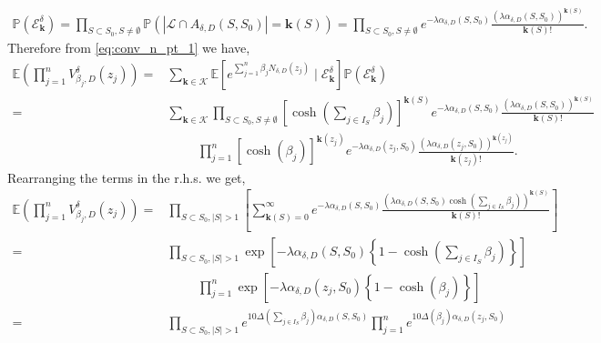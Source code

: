 \documentclass[a4paper, 11pt, reqno]{amsart}
\theoremstyle{definition} \newtheorem{defn}{Definition}[section]
\theoremstyle{remark} \newtheorem{rem}[defn]{Remark}
\theoremstyle{remark} \newtheorem*{rem*}{Remark}
\theoremstyle{plain} \newtheorem{thm}[defn]{Theorem}
\theoremstyle{plain} \newtheorem{lem}[defn]{Lemma}
\theoremstyle{plain} \newtheorem{prop}[defn]{Proposition}
\theoremstyle{plain} \newtheorem{cor}[defn]{Corollary}
\theoremstyle{remark} \newtheorem{exm}[defn]{\textbf{Example}}
\theoremstyle{remark} \newtheorem{exms}[defn]{\textbf{Examples}}
\theoremstyle{remark} \newtheorem*{bl}{}
\numberwithin{equation}{section} %
\newcommand{\mc}{\mathcal}
\newcommand{\pr}{\mathbb{P}}
\newcommand{\E}{\mathbb{E}}
\begin{document}
		\begin{align}
			\pr(\mc{E}^{\delta}_{\bm{k}}) =   \prod_{S\subset S_0, S\neq \emptyset} \pr( | \mc{L} \cap A_{\delta, D}(S, S_0)| = \bm{k}(S) )
	       =\prod_{S\subset S_0, S\neq \emptyset} e^{-\lambda \alpha_{\delta, D}(S, S_0)} \frac{(\lambda \alpha_{\delta, D}(S, S_0))^{\bm{k}(S)}}{\bm{k}(S)! }.
		\end{align}		
		Therefore from \eqref{eq:conv_n_pt_1} we have,
		\begin{align}
			\E\left(\prod_{j=1}^n V^{\delta}_{\beta_j , D}(z_j)\right) 	= & \sum_{\bm{k} \in \mc{K}} \E\left[  e^{\sum_{j=1}^n \beta_j N_{\delta, D}(z_j)} \mid \mc{E}^{\delta}_{\bm{k}} \right]	\pr(\mc{E}^{\delta}_{\bm{k}})
			\nonumber \\
			= & \sum_{\bm{k} \in \mc{K}} \prod_{S\subset S_0, S\neq \emptyset} \left[\cosh\left(\sum_{j \in I_S} \beta_j\right)\right]^{\bm{k}(S)} e^{-\lambda \alpha_{\delta, D}(S, S_0)} \frac{(\lambda \alpha_{\delta, D}(S, S_0))^{\bm{k}(S)}}{\bm{k}(S)! }
			\nonumber \\
			& \hspace{1cm} \prod_{j=1}^n \left[\cosh\left(\beta_j\right)\right]^{\bm{k}(z_j)} e^{-\lambda \alpha_{\delta, D}(z_j, S_0)} \frac{(\lambda \alpha_{\delta, D}(z_j, S_0))^{\bm{k}(z_j)}}{\bm{k}(z_j)! } .
		\end{align}
        Rearranging the terms in the r.h.s. we get,
        \begin{align}\label{eq:conv_n_pt_5}
			\E\left(\prod_{j=1}^n V^{\delta}_{\beta_j , D}(z_j)\right) = & \prod_{S\subset S_0, |S|>1} \left[ \sum_{\bm{k}(S)=0}^{\infty} e^{-\lambda \alpha_{\delta, D}(S, S_0)} \frac{\left(\lambda \alpha_{\delta, D}(S, S_0) \cosh\left(\sum_{j \in I_S} \beta_j\right)\right)^{\bm{k}(S)}}{\bm{k}(S)! } \right]
			\nonumber \\
			= & \prod_{S\subset S_0, |S|>1}  \exp\left[ -\lambda \alpha_{\delta, D}(S, S_0) \left\{ 1- \cosh\left(\sum_{j \in I_S} \beta_j\right)\right\}\right]
			\nonumber \\
			& \hspace{1cm} \prod_{j=1}^n \exp\left[ -\lambda \alpha_{\delta, D}(z_j, S_0) \left\{ 1- \cosh\left( \beta_j\right)\right\}\right]
            \nonumber \\
            = &  \prod_{S\subset S_0, |S|>1}  e^{10 \Delta\left(\sum_{j \in I_S} \beta_j\right) \alpha_{\delta, D}(S, S_0)}
			\prod_{j=1}^n e^{10\Delta(\beta_j)\alpha_{\delta, D}(z_j, S_0)}
		\end{align}
		
\end{document}
